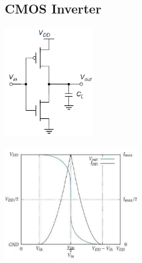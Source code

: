 	\subsection{CMOS Inverter}
		\begin{center}
			\begin{multicols}{2}
				\includegraphics[width=4cm]{images/cmosInverterSchema.png}\\
				\columnbreak
				
				\includegraphics[width=6cm]{images/cmosInverterSignal.png}\\
			\end{multicols}
		\end{center}
